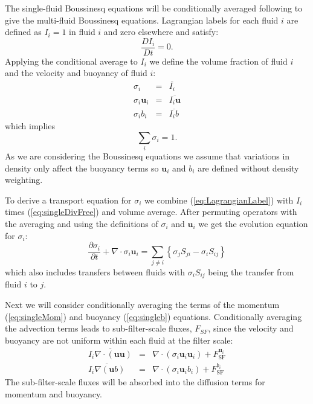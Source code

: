 \documentclass[draft]{agujournal2019}
\begin{document}
The single-fluid Boussinesq equations will be conditionally averaged following  to give the multi-fluid Boussinesq equations. Lagrangian labels for each fluid $i$ are defined as $I_i=1$ in fluid $i$ and zero elsewhere and satisfy:
\begin{equation}
\frac{DI_i}{Dt}=0.
\label{eq:LagrangianLabel}
\end{equation}
Applying the conditional average to $I_i$ we define the volume fraction of fluid $i$ and the velocity and buoyancy of fluid $i$:
\begin{eqnarray}
\sigma_i &=& \overline{I_i} \\
\sigma_i \mathbf{u}_i &=& \overline{I_i \mathbf{u}} \\
\sigma_i b_i &=& \overline{I_i b}
\label{eq:defineFluidFields}
\end{eqnarray}
which implies
\begin{equation}
\sum_{i}\sigma_{i}  =  1.
\label{eq:sumOne}
\end{equation}
As we are considering the Boussinesq equations we assume that variations in density only affect the buoyancy terms so $\mathbf{u}_i$ and $b_i$ are defined without density weighting. 

To derive a transport equation for $\sigma_i$ we combine (\ref{eq:LagrangianLabel}) with $I_i$ times (\ref{eq:singleDivFree}) and volume average. After permuting operators with the averaging \cite<as described by>{TWV+18} and using the definitions of $\sigma_i$ and $\mathbf{u}_i$ we get the evolution equation for $\sigma_i$:
\begin{equation}
\frac{\partial\sigma_{i}}{\partial t}+\nabla\cdot\sigma_{i}\mathbf{u}_{i}  =  \sum_{j\ne i}\left\{ \sigma_{j}S_{ji}-\sigma_{i}S_{ij}\right\}
\label{eq:sigma}
\end{equation}
which also includes transfers between fluids with $\sigma_{i}S_{ij}$ being the transfer from fluid $i$ to $j$.

Next we will consider conditionally averaging the terms of the momentum (\ref{eq:singleMom}) and buoyancy (\ref{eq:singleb}) equations. Conditionally averaging the advection terms leads to sub-filter-scale fluxes, $F_{SF}$, since the velocity and buoyancy are not uniform within each fluid at the filter scale:
\begin{eqnarray}
\overline{I_i \nabla \cdot (\mathbf{u} \mathbf{u})} &=& \nabla \cdot (\sigma_i \mathbf{u}_i  \mathbf{u}_i) + F_\text{SF}^{\mathbf{u}_i} \\
\overline{I_i \nabla (\mathbf{u} b)} &=&  \nabla \cdot (\sigma_i \mathbf{u}_i b_i) + F_\text{SF}^{b_i}
\label{eq:filterAdvection}
\end{eqnarray}
The sub-filter-scale fluxes will be absorbed into the diffusion terms for momentum and buoyancy.
\end{document}
